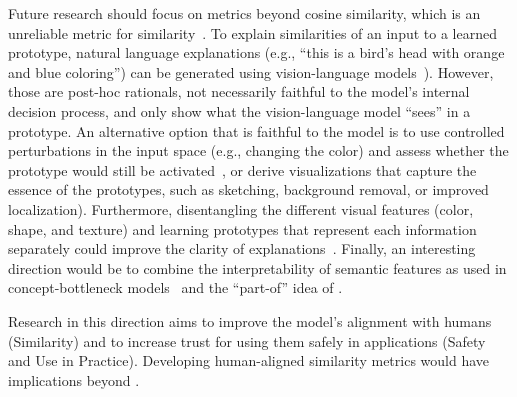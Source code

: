Future research should focus on metrics beyond cosine similarity, which is an unreliable metric for similarity~\cite{Steck_2024_CosineSimilarityEmbeddingsReally}. 
To explain similarities of an input to a learned prototype, natural language explanations (e.g., ``this is a bird's head with orange and blue coloring'') can be generated using vision-language models~\cite{feldhus_2023_SaliencyMaps}).
However, those are post-hoc rationals, not necessarily faithful to the model's internal decision process, and only show what the vision-language model ``sees'' in a prototype.
An alternative option that is faithful to the model is to use controlled perturbations in the input space (e.g., changing the color) and assess whether the prototype would still be activated~\cite{Nauta_2021_ThisLooksThat}, or derive visualizations that capture the essence of the prototypes, such as sketching, background removal, or improved localization). Furthermore, disentangling the different visual features (color, shape, and texture) and learning prototypes that represent each information separately could improve the clarity of explanations~\cite{Pach_2024_LucidPPNUnambiguousPrototypical}.
Finally, an interesting direction would be to combine the interpretability of semantic features as used in concept-bottleneck models~\citep{Koh2000_concept-bottleneck-models} and the ``part-of'' idea of \ppms.

Research in this direction aims to improve the model's alignment with humans (\texorpdfstring{\colorbox[RGB]{191, 239, 239}{Similarity}}{Similarity}) %
and to increase trust for using them safely in applications (\texorpdfstring{\colorbox[RGB]{242,96,119}{Safety and Use in Practice}}{Safety and Use in Practice}).
Developing human-aligned similarity metrics would have implications beyond \ppms.

